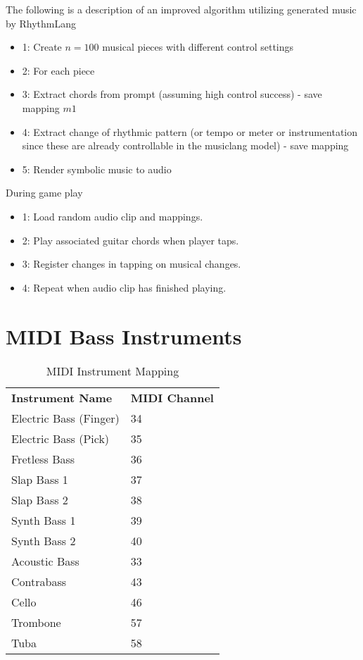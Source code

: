 The following is a description of an improved algorithm utilizing generated music by RhythmLang
\begin{itemize}
    \item{1}: Create $n=100$ musical pieces with different control settings
    \item{2}: For each piece
    \item{3}: Extract chords from prompt (assuming high control success) - save mapping $m1$
    \item{4}: Extract change of rhythmic pattern (or tempo or meter or instrumentation since these are already controllable in the musiclang model) - save mapping
    \item{5}: Render symbolic music to audio
\end{itemize}

During game play
\begin{itemize}
    \item{1}: Load random audio clip and mappings.
    \item{2}: Play associated guitar chords when player taps.
    \item{3}: Register changes in tapping on musical changes.
    \item{4}: Repeat when audio clip has finished playing.
\end{itemize}


\section{MIDI Bass Instruments}\label{midi-bass}
\begin{table}[h]
    \centering
    \begin{tabular}{ll}
        \textbf{Instrument Name} & \textbf{MIDI Channel} \\
        Electric Bass (Finger)  & 34 \\
        Electric Bass (Pick)    & 35 \\
        Fretless Bass           & 36 \\
        Slap Bass 1            & 37 \\
        Slap Bass 2            & 38 \\
        Synth Bass 1           & 39 \\
        Synth Bass 2           & 40 \\
        Acoustic Bass          & 33 \\
        Contrabass             & 43 \\
        Cello                  & 46 \\
        Trombone               & 57 \\
        Tuba                   & 58 \\
    \end{tabular}
    \caption{MIDI Instrument Mapping}
    \label{tab:midi_instruments}
\end{table}



